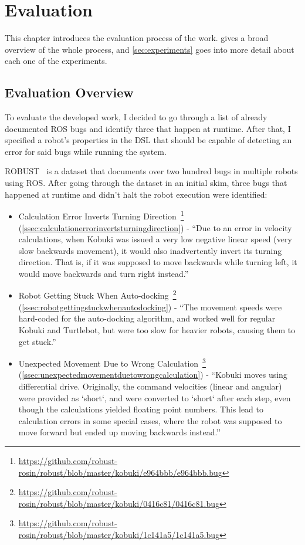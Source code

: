 \chapter{Evaluation}
\label{chap:evaluation}

This chapter introduces the evaluation process of the work.  gives a broad overview of the whole process, and \autoref{sec:experiments} goes into more detail about each one of the experiments.


\section{Evaluation Overview}
\label{sec:evaluationoverview}

To evaluate the developed work, I decided to go through a list of already documented ROS bugs and identify three that happen at runtime. After that, I specified a robot's properties in the DSL that should be capable of detecting an error for said bugs while running the system.

ROBUST~\cite{robust} is a dataset that documents over two hundred bugs in multiple robots using ROS. After going through the dataset in an initial skim, three bugs that happened at runtime and didn't halt the robot execution were identified:

\begin{itemize}
    \item Calculation Error Inverts Turning Direction~\footnote{\url{https://github.com/robust-rosin/robust/blob/master/kobuki/e964bbb/e964bbb.bug}} (\autoref{ssec:calculationerrorinvertsturningdirection}) - ``Due to an error in velocity calculations, when Kobuki was issued a very low negative linear speed (very slow backwards movement), it would also inadvertently invert its turning direction. That is, if it was supposed to move backwards while turning left, it would move backwards and turn right instead.''
    \item Robot Getting Stuck When Auto-docking~\footnote{\url{https://github.com/robust-rosin/robust/blob/master/kobuki/0416c81/0416c81.bug}} (\autoref{ssec:robotgettingstuckwhenautodocking}) - ``The movement speeds were hard-coded for the auto-docking algorithm, and worked well for regular Kobuki and Turtlebot, but were too slow for heavier robots, causing them to get stuck.''
    \item Unexpected Movement Due to Wrong Calculation~\footnote{\url{https://github.com/robust-rosin/robust/blob/master/kobuki/1c141a5/1c141a5.bug}} (\autoref{ssec:unexpectedmovementduetowrongcalculation}) - ``Kobuki moves using differential drive. Originally, the command velocities (linear and angular) were provided as `short`, and were converted to `short` after each step, even though the calculations yielded floating point numbers. This lead to calculation errors in some special cases, where the robot was supposed to move forward but ended up moving backwards instead.''
\end{itemize}

